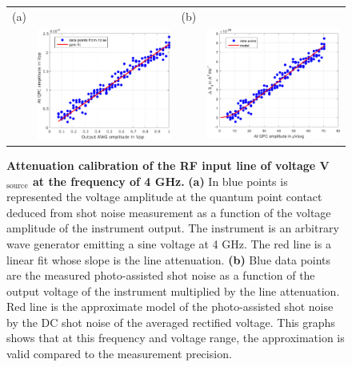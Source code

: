 \begin{figure}[hptb]
	\begin{center}
		\begin{tabular}{c c c c}
			(a) & & (b) &  \\ 
			
			& \includegraphics[width = 6cm]{./chap1/gain_injection_4GHz} &
			& \includegraphics[width = 6cm]{./chap1/PA_shoit_noise_renormalized_4GHz}
		\end{tabular} 
	\end{center}
	\caption{\textbf{Attenuation calibration of the RF input line of voltage V$_{\mathrm{source}}$ at the frequency of 4 GHz.} \textbf{(a)} In blue points is represented the voltage amplitude at the quantum point contact deduced from shot noise measurement as a function of the voltage amplitude of the instrument output. The instrument is an arbitrary wave generator emitting a sine voltage at 4 GHz. The red line is a linear fit whose slope is the line attenuation. \textbf{(b)} Blue data points are the measured photo-assisted shot noise as a function of the output voltage of the instrument multiplied by the line attenuation. Red line is the approximate model of the photo-assisted shot noise by the DC shot noise of the averaged rectified voltage. This graphs shows that at this frequency and voltage range, the approximation is valid compared to the measurement precision.}
	\label{fig: PA shot noise}
\end{figure}

